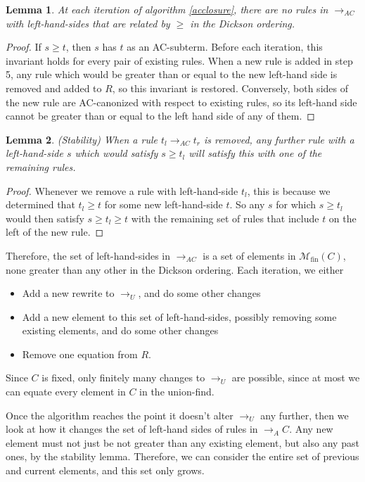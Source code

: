 \documentclass[12pt,a4paper,twoside,openright]{report}
\numberwithin{equation}{chapter}		%
\numberwithin{figure}{chapter}			%
\numberwithin{table}{chapter}			%
\theoremstyle{definition}
\theoremstyle{plain}
\newtheorem{lemma}{Lemma}
\begin{document}
\begin{lemma}
	At each iteration of algorithm \ref{acclosure}, there are no rules in $\rightarrow_{AC}$ with left-hand-sides that are related by $\ge$ in the Dickson ordering.
\end{lemma}
\begin{proof}
	If $s \ge t$, then $s$ has $t$ as an AC-subterm. Before each iteration, this invariant holds for every pair of existing rules. When a new rule is added in step 5, any rule which would be greater than or equal to the new left-hand side is removed and added to $R$, so this invariant is restored. Conversely, both sides of the new rule are AC-canonized with respect to existing rules, so its left-hand side cannot be greater than or equal to the left hand side of any of them.
\end{proof}

\begin{lemma}
	(Stability) When a rule $t_l \rightarrow_{AC} t_r$ is removed, any further rule with a left-hand-side $s$ which would satisfy $s \ge t_l$ will satisfy this with one of the remaining rules.
\end{lemma}
\begin{proof}
	Whenever we remove a rule with left-hand-side $t_l$, this is because we determined that $t_l \ge t$ for some new left-hand-side $t$. So any $s$ for which $s \ge t_l$ would then satisfy $s \ge t_l \ge t$ with the remaining set of rules that include $t$ on the left of the new rule.
\end{proof}

Therefore, the set of left-hand-sides in $\rightarrow_{AC}$ is a set of elements in $\mathcal{M}_\textrm{fin}(C)$, none greater than any other in the Dickson ordering. Each iteration, we either
	\begin{itemize}
		\item Add a new rewrite to $\rightarrow_U$, and do some other changes
		\item Add a new element to this set of left-hand-sides, possibly removing some existing elements, and do some other changes
		\item Remove one equation from $R$.
	\end{itemize}
	
Since $C$ is fixed, only finitely many changes to $\rightarrow_U$ are possible, since at most we can equate every element in $C$ in the union-find.

Once the algorithm reaches the point it doesn't alter $\rightarrow_U$	any further, then we look at how it changes the set of left-hand sides of rules in $\rightarrow_AC$. Any new element must not just be not greater than any existing element, but also any past ones, by the stability lemma. Therefore, we can consider the entire set of previous and current elements, and this set only grows.
\end{document}

